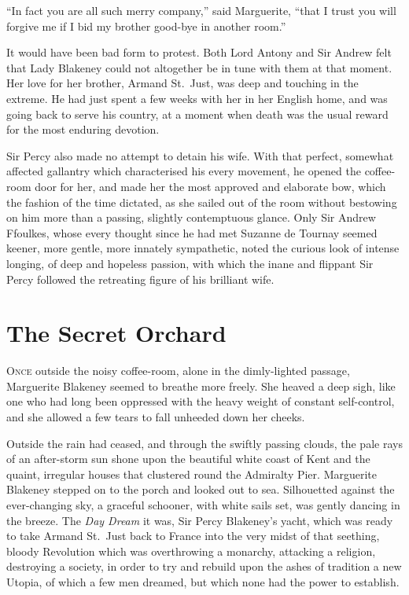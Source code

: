 \documentclass[paper=a5,BCOR=7mm,twoside,DIV=calc,12pt,usegeometry,chapterprefix,endperiod,headings=big]{scrbook}
\begin{document}
\enquote{In fact you are all such merry company,} said Marguerite, \enquote{that I trust you will forgive me if I bid my brother good-bye in another room.}

It would have been bad form to protest. Both Lord Antony and Sir Andrew felt that Lady Blakeney could not altogether be in tune with them at that moment. Her love for her brother, Armand St.~Just, was deep and touching in the extreme. He had just spent a few weeks with her in her English home, and was going back to serve his country, at a moment when death was the usual reward for the most enduring devotion.

Sir Percy also made no attempt to detain his wife. With that perfect, somewhat affected gallantry which characterised his every movement, he opened the coffee-room door for her, and made her the most approved and elaborate bow, which the fashion of the time dictated, as she sailed out of the room without bestowing on him more than a passing, slightly contemptuous glance. Only Sir Andrew Ffoulkes, whose every thought since he had met Suzanne de Tournay seemed keener, more gentle, more innately sympathetic, noted the curious look of intense longing, of deep and hopeless passion, with which the inane and flippant Sir Percy followed the retreating figure of his brilliant wife.

\chapter{The Secret Orchard}
\lettrine[lines=4]{O}{nce} outside the noisy coffee-room, alone in the dimly-lighted passage, Marguerite Blakeney  seemed to breathe more freely. She heaved a deep sigh, like one who had long been oppressed with the heavy weight of constant self-control, and she allowed a few tears to fall unheeded down her cheeks.

Outside the rain had ceased, and through the swiftly passing clouds, the pale rays of an after-storm sun shone upon the beautiful white coast of Kent and the quaint, irregular houses that clustered round the Admiralty Pier. Marguerite Blakeney stepped on to the porch and looked out to sea. Silhouetted against the ever-changing sky, a graceful schooner, with white sails set, was gently dancing in the breeze. The \textit{Day Dream} it was, Sir Percy Blakeney's yacht, which was ready to take Armand St.~Just back to France into the very midst of that seething, bloody Revolution which was overthrowing a monarchy, attacking a religion, destroying a society, in order to try and rebuild upon the ashes of tradition a new Utopia, of which a few men dreamed, but which none had the power to establish.
\end{document}
